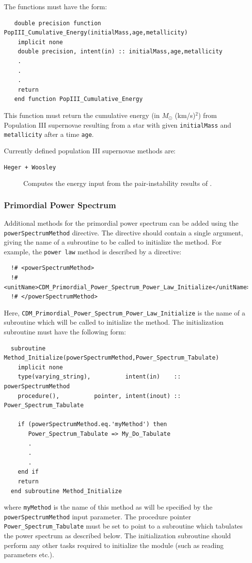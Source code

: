The functions must have the form:
\begin{verbatim}
   double precision function PopIII_Cumulative_Energy(initialMass,age,metallicity)
    implicit none
    double precision, intent(in) :: initialMass,age,metallicity
    .
    .
    .
    return
   end function PopIII_Cumulative_Energy 
\end{verbatim}
This function must return the cumulative energy (in $M_\odot$ (km/s)$^2$) from Population III supernovae resulting from a star with given {\tt initialMass} and {\tt metallicity} after a time {\tt age}.

Currently defined population III supernovae methods are:
\begin{description}
 \item [{\tt Heger + Woosley}] Computes the energy input from the pair-instability results of \cite{heger_nucleosynthetic_2002}.
\end{description}

\subsubsection{Primordial Power Spectrum}

Additional methods for the primordial power spectrum can be added using the {\tt powerSpectrumMethod} directive. The directive should contain a single argument, giving the name of a subroutine to be called to initialize the method. For example, the {\tt power law} method is described by a directive:
\begin{verbatim}
  !# <powerSpectrumMethod>
  !#  <unitName>CDM_Primordial_Power_Spectrum_Power_Law_Initialize</unitName>
  !# </powerSpectrumMethod>
\end{verbatim}
Here, {\tt CDM\_Primordial\_Power\_Spectrum\_Power\_Law\_Initialize} is the name of a subroutine which will be called to initialize the method. The initialization subroutine must have the following form:
\begin{verbatim}
  subroutine Method_Initialize(powerSpectrumMethod,Power_Spectrum_Tabulate)
    implicit none
    type(varying_string),          intent(in)    :: powerSpectrumMethod
    procedure(),          pointer, intent(inout) :: Power_Spectrum_Tabulate
    
    if (powerSpectrumMethod.eq.'myMethod') then
       Power_Spectrum_Tabulate => My_Do_Tabulate
       .
       .
       .
    end if
    return
  end subroutine Method_Initialize
\end{verbatim}
where {\tt myMethod} is the name of this method as will be specified by the {\tt powerSpectrumMethod} input parameter. The procedure pointer {\tt Power\_Spectrum\_Tabulate} must be set to point to a subroutine which tabulates the power spectrum as described below. The initialization subroutine should perform any other tasks required to initialize the module (such as reading parameters etc.).

